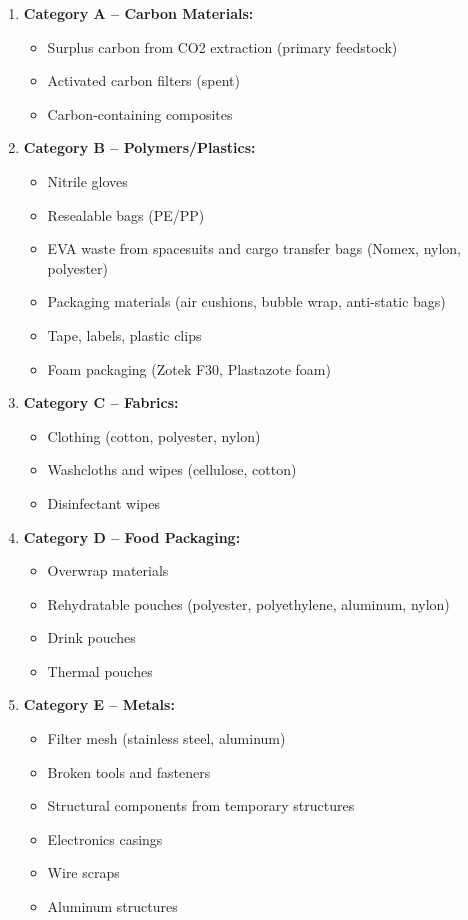 \documentclass[12pt, a4paper]{article}
\begin{document}
\begin{enumerate}
    \item \textbf{Category A -- Carbon Materials:}
    \begin{itemize}
        \item Surplus carbon from CO2 extraction (primary feedstock)
        \item Activated carbon filters (spent)
        \item Carbon-containing composites
    \end{itemize}

    \item \textbf{Category B -- Polymers/Plastics:}
    \begin{itemize}
        \item Nitrile gloves
        \item Resealable bags (PE/PP)
        \item EVA waste from spacesuits and cargo transfer bags (Nomex, nylon, polyester)
        \item Packaging materials (air cushions, bubble wrap, anti-static bags)
        \item Tape, labels, plastic clips
        \item Foam packaging (Zotek F30, Plastazote foam)
    \end{itemize}

    \item \textbf{Category C -- Fabrics:}
    \begin{itemize}
        \item Clothing (cotton, polyester, nylon)
        \item Washcloths and wipes (cellulose, cotton)
        \item Disinfectant wipes 
    \end{itemize}

    \item \textbf{Category D -- Food Packaging:}
    \begin{itemize}
        \item Overwrap materials
        \item Rehydratable pouches (polyester, polyethylene, aluminum, nylon)
        \item Drink pouches
        \item Thermal pouches
    \end{itemize}

    \item \textbf{Category E -- Metals:}
    \begin{itemize}
        \item Filter mesh (stainless steel, aluminum)
        \item Broken tools and fasteners
        \item Structural components from temporary structures
        \item Electronics casings
        \item Wire scraps
        \item Aluminum structures
    \end{itemize}


\end{enumerate}
\end{document}
